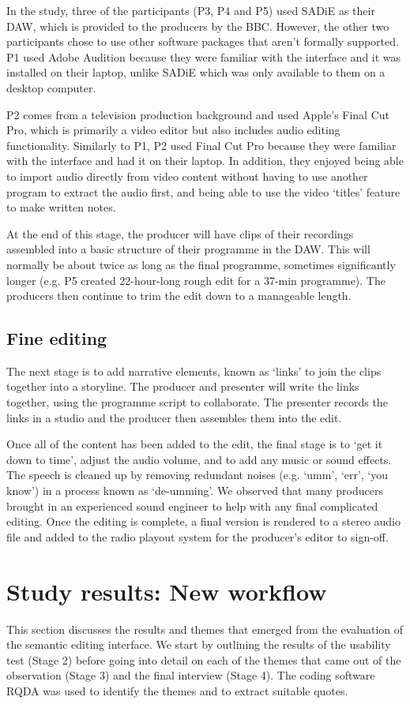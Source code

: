 In the study, three of the participants (P3, P4 and P5) used SADiE as their DAW, which is provided to the producers by
the BBC. However, the other two participants chose to use other software packages that aren't formally supported. P1
used Adobe Audition because they were familiar with the interface and it was installed on their laptop, unlike SADiE
which was only available to them on a desktop computer.

P2 comes from a television production background and used Apple's Final Cut Pro, which is primarily a video editor but
also includes audio editing functionality.  Similarly to P1, P2 used Final Cut Pro because they were familiar with the
interface and had it on their laptop. In addition, they enjoyed being able to import audio directly from video content
without having to use another program to extract the audio first, and being able to use the video `titles' feature to
make written notes.

At the end of this stage, the producer will have clips of their recordings assembled into a basic structure of their
programme in the DAW. This will normally be about twice as long as the final programme, sometimes significantly longer
(e.g. P5 created 22-hour-long rough edit for a 37-min programme). The producers then continue to trim the edit down to
a manageable length.

\subsection{Fine editing}
The next stage is to add narrative elements, known as `links' to join the clips together into a storyline. The producer
and presenter will write the links together, using the programme script to collaborate. The presenter records the links
in a studio and the producer then assembles them into the edit.

Once all of the content has been added to the edit, the final stage is to `get it down to time', adjust the audio
volume, and to add any music or sound effects. The speech is cleaned up by removing redundant noises (e.g.  `umm',
`err', `you know') in a process known as `de-umming'. We observed that many producers brought in an experienced sound
engineer to help with any final complicated editing.  Once the editing is complete, a final version is rendered to a
stereo audio file and added to the radio playout system for the producer's editor to sign-off.

\section{Study results: New workflow}\label{sec:resultsnew}
This section discusses the results and themes that emerged from the evaluation of the semantic editing interface. We
start by outlining the results of the usability test (Stage 2) before going into detail on each of the themes that came
out of the observation (Stage 3) and the final interview (Stage 4).  The coding software RQDA was used to identify the
themes and to extract suitable quotes.

